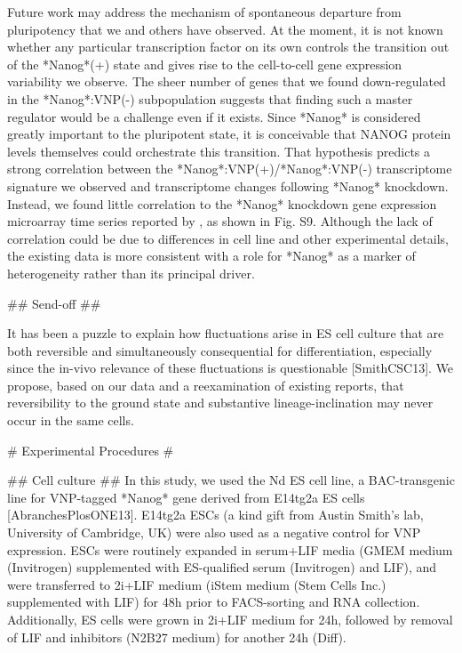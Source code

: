 \documentclass[aps,prl,twocolumn,superscriptaddress]{revtex4}
\begin{document}
Future work may address the mechanism of spontaneous departure from pluripotency that we and others have observed. At the moment, it is not known whether any particular transcription factor on its own controls the transition out of the *Nanog*(+) state and gives rise to the cell-to-cell gene expression variability we observe. The sheer number of genes that we found down-regulated in the *Nanog*:VNP(-) subpopulation suggests that finding such a master regulator would be a challenge even if it exists. Since *Nanog* is considered greatly important to the pluripotent state, it is conceivable that NANOG protein levels themselves could orchestrate this transition. That hypothesis predicts a strong correlation between the *Nanog*:VNP(+)/*Nanog*:VNP(-) transcriptome signature we observed and transcriptome changes following *Nanog* knockdown. Instead, we found little correlation to the  *Nanog* knockdown gene expression microarray time series reported by \citet{MacArthurNatGen12}, as shown in Fig. S9. Although the lack of correlation could be due to differences in cell line and other experimental details, the existing data is more consistent with a role for *Nanog* as a marker of heterogeneity rather than its principal driver. 

## Send-off ##

It has been a puzzle to explain how fluctuations arise in ES cell culture that are both reversible and simultaneously consequential for differentiation, especially since the in-vivo relevance of these fluctuations is questionable [SmithCSC13]. We propose, based on our data and a reexamination of existing reports, that reversibility to the ground state and substantive lineage-inclination may never occur in the same cells.


# Experimental Procedures #

## Cell culture ##
In this study, we used the Nd ES cell line, a BAC-transgenic line for VNP-tagged *Nanog* gene derived from E14tg2a ES cells [AbranchesPlosONE13]. E14tg2a ESCs (a kind gift from Austin Smith's lab, University of Cambridge, UK) were also used as a negative control for VNP expression. ESCs were routinely expanded in serum+LIF media (GMEM medium (Invitrogen) supplemented with ES-qualified serum (Invitrogen) and LIF), and were transferred to 2i+LIF medium (iStem medium (Stem Cells Inc.) supplemented with LIF) for 48h prior to FACS-sorting and RNA collection. Additionally, ES cells were grown in 2i+LIF medium for 24h, followed by removal of LIF and inhibitors (N2B27 medium) for another 24h (Diff). 
\end{document}
